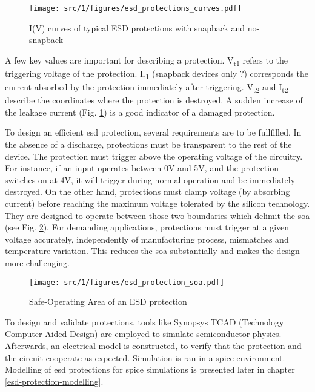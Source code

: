 \begin{figure}[!h]
  \centering
  \texttt{[image: src/1/figures/esd\_protections\_curves.pdf]}
  \caption{I(V) curves of typical ESD protections with snapback and no-snapback}
  \label{fig:iv-curve-esd-protection}
\end{figure}

A few key values are important for describing a protection.
V\textsubscript{t1} refers to the triggering voltage of the protection.
I\textsubscript{t1} (snapback devices only ?) corresponds the current absorbed by the protection immediately after triggering.
V\textsubscript{t2} and I\textsubscript{t2} describe the coordinates where the protection is destroyed.
A sudden increase of the leakage current (Fig. \ref{fig:iv-curve-esd-protection}) is a good indicator of a damaged protection.


To design an efficient \gls{esd} protection, several requirements are to be fullfilled.
In the absence of a discharge, protections must be transparent to the rest of the device.
The protection must trigger above the operating voltage of the circuitry.
For instance, if an input operates between 0V and 5V, and the protection switches on at 4V, it will trigger during normal operation and be immediately destroyed.
On the other hand, protections must clamp voltage (by absorbing current) before reaching the maximum voltage tolerated by the silicon technology.
They are designed to operate between those two boundaries which delimit the \gls{soa} (see Fig. \ref{fig:soa-esd-protection}).
For demanding applications, protections must trigger at a given voltage accurately, independently of manufacturing process, mismatches and temperature variation.
This reduces the \gls{soa} substantially and makes the design more challenging.

\begin{figure}[!h]
  \centering
  \texttt{[image: src/1/figures/esd\_protection\_soa.pdf]}
  \caption{Safe-Operating Area of an ESD protection}
  \label{fig:soa-esd-protection}
\end{figure}

To design and validate protections, tools like Synopsys TCAD (Technology Computer Aided Design) \cite{tcad} are employed to simulate semiconductor physics.
Afterwards, an electrical model is constructed, to verify that the protection and the circuit cooperate as expected.
Simulation is ran in a \gls{spice} environment.
Modelling of \gls{esd} protections for \gls{spice} simulations is presented later in chapter \ref{esd-protection-modelling}.
